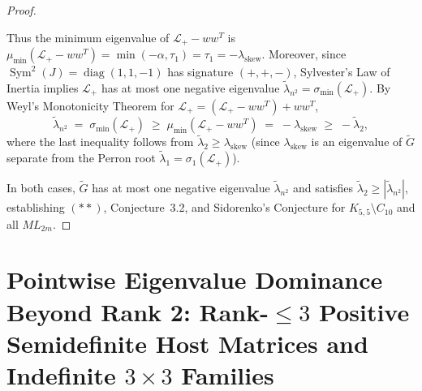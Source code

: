 \documentclass[11pt,a4paper]{article}
\theoremstyle{plain}
\theoremstyle{definition}
\theoremstyle{remark}
\DeclareMathOperator{\Sym}{Sym}
\DeclareMathOperator{\diag}{diag}
\begin{document}
\begin{proof}
\begin{itemize}
\[  \]
  Thus the minimum eigenvalue of $\mathcal{L}_+ - w w^T$ is $\mu_{\min}(\mathcal{L}_+ - w w^T) = \min(-\alpha, \tau_1) = \tau_1 = -\lambda_{\mathrm{skew}}$. Moreover, since $\Sym^2(J) = \diag(1, 1, -1)$ has signature $(+,+,-)$, Sylvester's Law of Inertia implies $\mathcal{L}_+$ has at most one negative eigenvalue $\widetilde{\lambda}_{n^2} = \sigma_{\min}(\mathcal{L}_+)$. By Weyl's Monotonicity Theorem for $\mathcal{L}_+ = (\mathcal{L}_+ - w w^T) + w w^T$,
  \[
    \widetilde{\lambda}_{n^2} \;=\; \sigma_{\min}(\mathcal{L}_+) \;\ge\; \mu_{\min}(\mathcal{L}_+ - w w^T) \;=\; -\lambda_{\mathrm{skew}} \;\ge\; -\widetilde{\lambda}_2,
  \]
  where the last inequality follows from $\widetilde{\lambda}_2 \ge \lambda_{\mathrm{skew}}$ (since $\lambda_{\mathrm{skew}}$ is an eigenvalue of $\widetilde{G}$ separate from the Perron root $\widetilde{\lambda}_1 = \sigma_1(\mathcal{L}_+)$).
\end{itemize}
In both cases, $\widetilde{G}$ has at most one negative eigenvalue $\widetilde{\lambda}_{n^2}$ and satisfies $\widetilde{\lambda}_2 \ge |\widetilde{\lambda}_{n^2}|$, establishing $(**)$, Conjecture~3.2, and Sidorenko's Conjecture for $K_{5,5} \setminus C_{10}$ and all $ML_{2m}$.
\end{proof}

\section{Pointwise Eigenvalue Dominance Beyond Rank 2: Rank-\texorpdfstring{$\le 3$}{<= 3} Positive Semidefinite Host Matrices and Indefinite \texorpdfstring{$3 \times 3$}{3x3} Families}\label{sec:rank3}
\end{document}
